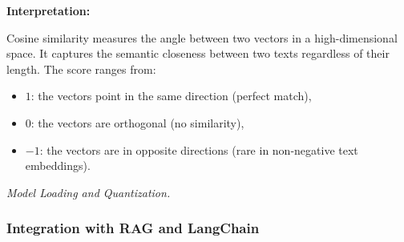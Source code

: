 \documentclass[conference]{IEEEtran}
\begin{document}
\textbf{Interpretation:}

Cosine similarity measures the angle between two vectors in a high-dimensional space. It captures the semantic closeness between two texts regardless of their length. The score ranges from:
\begin{itemize}
  \item $1$: the vectors point in the same direction (perfect match),
  \item $0$: the vectors are orthogonal (no similarity),
  \item $-1$: the vectors are in opposite directions (rare in non-negative text embeddings).
\end{itemize}

\textit{Model Loading and Quantization.}
\subsubsection{Integration with RAG and LangChain}



\end{document}
